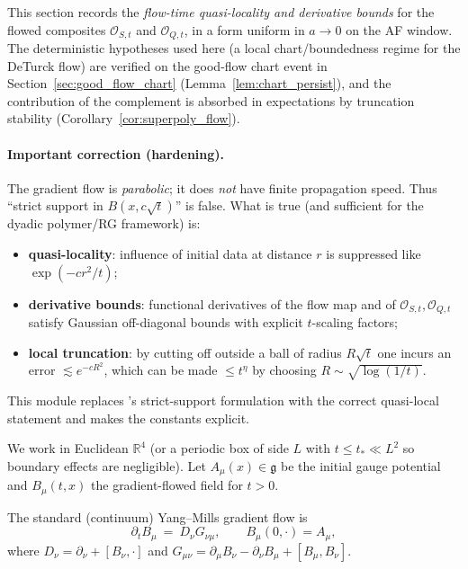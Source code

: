This section records the \emph{flow-time quasi-locality and derivative bounds}
for the flowed composites $\mathcal O_{S,t}$ and $\mathcal O_{Q,t}$, in a form uniform in $a\to 0$ on the AF window.
The deterministic hypotheses used here (a local chart/boundedness regime for the DeTurck flow) are verified on the
good-flow chart event in Section~\ref{sec:good_flow_chart} (Lemma~\ref{lem:chart_persist}), and the contribution of the
complement is absorbed in expectations by truncation stability (Corollary~\ref{cor:superpoly_flow}).

\paragraph{Important correction (hardening).}
The gradient flow is \emph{parabolic}; it does \emph{not} have finite propagation speed.
Thus ``strict support in $B(x,c\sqrt t)$'' is false. What is true (and sufficient for the dyadic polymer/RG framework) is:
\begin{itemize}
\item \textbf{quasi-locality}: influence of initial data at distance $r$ is suppressed like $\exp(-c r^2/t)$;
\item \textbf{derivative bounds}: functional derivatives of the flow map and of $\mathcal O_{S,t},\mathcal O_{Q,t}$ satisfy Gaussian off-diagonal bounds with
explicit $t$-scaling factors;
\item \textbf{local truncation}: by cutting off outside a ball of radius $R\sqrt t$ one incurs an error $\lesssim e^{-cR^2}$, which can be made $\le t^\eta$ by choosing $R\sim \sqrt{\log(1/t)}$.
\end{itemize}

This module replaces 's strict-support formulation with the correct quasi-local statement and makes the constants explicit.

We work in Euclidean $\mathbb R^4$ (or a periodic box of side $L$ with $t\le t_\ast\ll L^2$ so boundary effects are negligible).
Let $A_\mu(x)\in\mathfrak g$ be the initial gauge potential and $B_\mu(t,x)$ the gradient-flowed field for $t>0$.

The standard (continuum) Yang--Mills gradient flow is
\begin{equation}\label{eq:cov_flow}
\partial_t B_\mu \ =\ D_\nu G_{\nu\mu},\qquad B_\mu(0,\cdot)=A_\mu,
\end{equation}
where $D_\nu=\partial_\nu+[B_\nu,\cdot]$ and $G_{\mu\nu}=\partial_\mu B_\nu-\partial_\nu B_\mu+[B_\mu,B_\nu]$.

